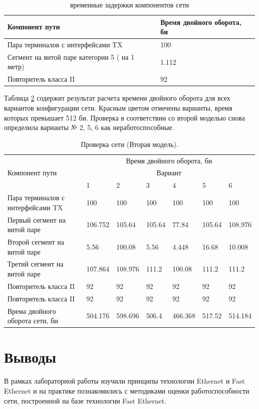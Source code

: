 \begin{table}[!ht]
    \caption{временные задержки компонентов сети}
    \label{tab:data}
    \centering
    \begin{tabular}{|l|l|}
    \hline
        Компонент пути & Время двойного оборота, би \\ \hline
        Пара терминалов с интерфейсами TX & 100 \\ \hline
        Сегмент на витой паре категории 5 ( на 1 метр) & 1.112 \\ \hline
        Повторитель класса II  & 92 \\ \hline
    \end{tabular}
\end{table}

Таблица \ref{tab:model2} содержит результат расчета времени двойного оборота для
всех вариантов конфигурации сети. Красным цветом отмечены варианты, время которых
превышает 512 би. Проверка в соответствии со второй моделью снова определила варианты
№ 2, 5, 6  как неработоспособные.
\begin{table}[!ht]
    \caption{Проверка сети (Вторая модель).}
    \label{tab:model2}
    \centering
    \begin{tabular}{|l|l|l|l|l|l|l|}
    \hline
    \multirow{3}{*}{Компонент пути} & \multicolumn{6}{|c|}{Время двойного оборота, би} \\ \cline{2-7}
                                    & \multicolumn{6}{|c|}{Вариант} \\ \cline{2-7}
                                    & 1 & 2 & 3 & 4 & 5 & 6 \\ \hline
        Пара терминалов с интерфейсами TX & 100 & 100 & 100 & 100 & 100 & 100 \\ \hline
        Первый сегмент на витой паре & 106.752 & 105.64 & 105.64 & 77.84 & 105.64 & 108.976 \\ \hline
        Второй сегмент на витой паре & 5.56 & 100.08 & 5.56 & 4.448 & 16.68 & 10.008 \\ \hline
        Третий сегмент на витой паре & 107.864 & 108.976 & 111.2 & 100.08 & 111.2 & 111.2 \\ \hline
        Повторитель класса II & 92 & 92 & 92 & 92 & 92 & 92 \\ \hline
        Повторитель класса II & 92 & 92 & 92 & 92 & 92 & 92 \\ \hline
        Врема двойного оборота сети, би & 504.176 & \cellcolor{red} 598.696 & 506.4 & 466.368 &\cellcolor{red} 517.52 &\cellcolor{red} 514.184 \\ \hline
    \end{tabular}
\end{table}


\newpage
\section{Выводы}
В рамках лабораторной работы изучили принципы технологии Ethernet и Fast Ethernet
и на практике познакомились с методиками оценки работоспособности сети, построенной
на базе технологии Fast Ethernet.

